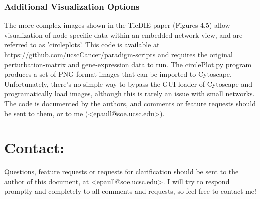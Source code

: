 \documentclass[11pt]{report}
\newcommand{\emailaddr}[1]{\textless\url{#1}\textgreater}
\begin{document}
\clearpage

\subsection{Additional Visualization Options}

The more complex images shown in the TieDIE paper (Figures 4,5) allow visualization of node-specific data within an embedded network view, 
and are referred to as 'circleplots'. 
This code is available at \url{https://github.com/ucscCancer/paradigm-scripts} and requires the original perturbation-matrix and gene-expression data to run. The circlePlot.py program produces a set of PNG format images that can be imported to Cytoscape. Unfortunately, there's no simple way to bypass the GUI loader of Cytoscape and programatically load images, although this is rarely an issue with small networks. The code is documented by the authors, and comments or feature requests should be sent to them, or to me (\emailaddr{epaull@soe.ucsc.edu}). 

\chapter{Contact:}

Questions, feature requests or requests for clarification should be sent to the author of this document, at \emailaddr{epaull@soe.ucsc.edu}. I will try to respond promptly and completely to all comments and requests, so feel free to contact me!
 

\end{document}
